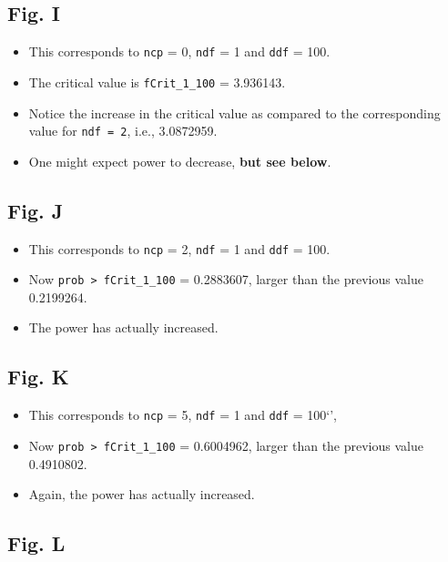 \documentclass[]{book}
\providecommand{\tightlist}{%
  \setlength{\itemsep}{0pt}\setlength{\parskip}{0pt}}
\begin{document}
\hypertarget{fig.-i}{%
\subsection{Fig. I}\label{fig.-i}}

\begin{itemize}
\tightlist
\item
  This corresponds to \texttt{ncp} = 0, \texttt{ndf} = 1 and \texttt{ddf} = 100.
\item
  The critical value is \texttt{fCrit\_1\_100} = 3.936143.
\item
  Notice the increase in the critical value as compared to the corresponding value for \texttt{ndf\ =\ 2}, i.e., 3.0872959.
\item
  One might expect power to decrease, \textbf{but see below}.
\end{itemize}

\hypertarget{fig.-j}{%
\subsection{Fig. J}\label{fig.-j}}

\begin{itemize}
\tightlist
\item
  This corresponds to \texttt{ncp} = 2, \texttt{ndf} = 1 and \texttt{ddf} = 100.
\item
  Now \texttt{prob\ \textgreater{}\ fCrit\_1\_100} = 0.2883607, larger than the previous value 0.2199264.
\item
  The power has actually increased.
\end{itemize}

\hypertarget{fig.-k}{%
\subsection{Fig. K}\label{fig.-k}}

\begin{itemize}
\tightlist
\item
  This corresponds to \texttt{ncp} = 5, \texttt{ndf} = 1 and \texttt{ddf} = 100`',
\item
  Now \texttt{prob\ \textgreater{}\ fCrit\_1\_100} = 0.6004962, larger than the previous value 0.4910802.
\item
  Again, the power has actually increased.
\end{itemize}

\hypertarget{fig.-l}{%
\subsection{Fig. L}\label{fig.-l}}
\end{document}
